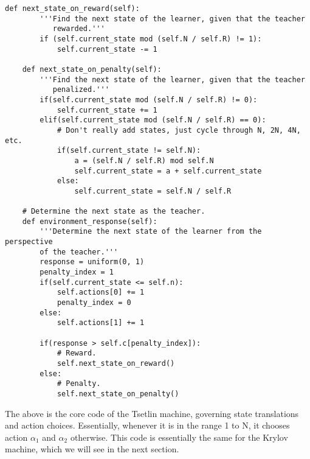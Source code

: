 \documentclass[10pt,english]{article}
\begin{document}
\begin{lstlisting}[label={list:first},caption=Tsetlin core code.] 
     def next_state_on_reward(self):
        '''Find the next state of the learner, given that the teacher
           rewarded.'''
        if (self.current_state mod (self.N / self.R) != 1):
            self.current_state -= 1

    def next_state_on_penalty(self):
        '''Find the next state of the learner, given that the teacher
           penalized.'''
        if(self.current_state mod (self.N / self.R) != 0):
            self.current_state += 1
        elif(self.current_state mod (self.N / self.R) == 0):
            # Don't really add states, just cycle through N, 2N, 4N, etc.
            if(self.current_state != self.N):
                a = (self.N / self.R) mod self.N
                self.current_state = a + self.current_state
            else:
                self.current_state = self.N / self.R

    # Determine the next state as the teacher.
    def environment_response(self):
        '''Determine the next state of the learner from the perspective
        of the teacher.'''
        response = uniform(0, 1)
        penalty_index = 1
        if(self.current_state <= self.n):
            self.actions[0] += 1
            penalty_index = 0
        else:
            self.actions[1] += 1

        if(response > self.c[penalty_index]):
            # Reward.
            self.next_state_on_reward()
        else:
            # Penalty.
            self.next_state_on_penalty()
\end{lstlisting}
The above is the core code of the Tsetlin machine, governing state translations and action choices.  Essentially, whenever it is in the range 1 to N, it chooses action $\alpha_1$ and $\alpha_2$ otherwise.  This code is essentially the same for the Krylov machine, which we will see in the next section.
\end{document}

